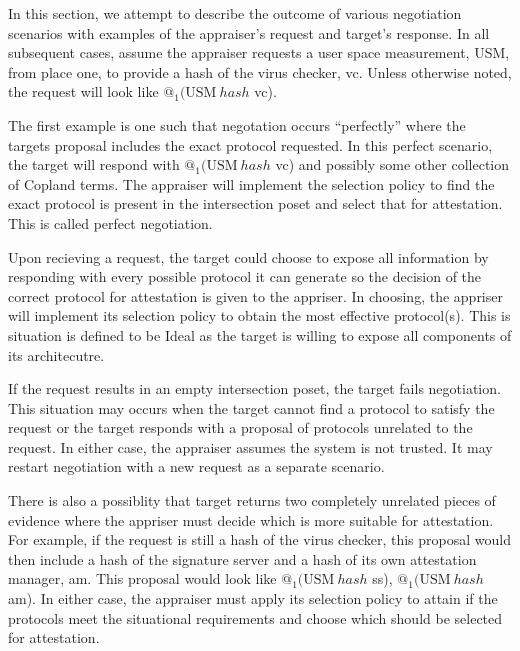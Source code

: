 \documentclass[sigconf,authordraft]{acmart}
\begin{document}
  
In this section, we attempt to describe the outcome of various
negotiation scenarios with examples of the appraiser's request and
target's response. In all
subsequent cases, assume the appraiser requests a user space measurement, USM, from place one, to provide a hash of the virus
checker, vc. Unless otherwise noted, the request will look like
$@_1 (\text{USM}\: hash$ vc).

The first example is one such that negotation occurs ``perfectly'' where the targets proposal includes the exact protocol requested. In
this \gls{perfect} scenario, the target will respond with
$@_1 (\text{USM}\: hash$ vc) and possibly some other collection of
Copland terms. The appraiser will implement the selection policy to find the exact protocol is present
in the intersection poset and select that for attestation. This is called perfect negotiation.

Upon recieving a request, the target could choose to expose all information by responding with every
possible protocol it can generate so the decision of the correct protocol for attestation is given to the appriser. In choosing, the appriser will implement its selection policy to obtain the most effective protocol(s). This is situation is defined to be
\gls{Ideal} as the target is willing to expose all components of its
architecutre.

If the request results
in an empty intersection poset, the target fails negotiation. This situation may occurs when the target cannot
find a protocol to satisfy the request or the target responds with a
proposal of protocols unrelated to the request. In either case, the
appraiser assumes the system is not trusted. It may restart
negotiation with a new request as a separate scenario.

There is also a possiblity that target returns two completely
unrelated pieces of evidence where the appriser must decide which is more suitable for attestation. For example, if the request is still a
hash of the virus checker, this proposal would then include a hash of
the signature server and a hash of its own attestation manager,
am. This proposal would look like {$@_1 (\text{USM}\: hash$ ss),
  $@_1 (\text{USM}\: hash$ am)}. In either case, the appraiser must
apply its selection policy to attain if the protocols meet the situational requirements and choose which should be selected for attestation. 

\end{document}
